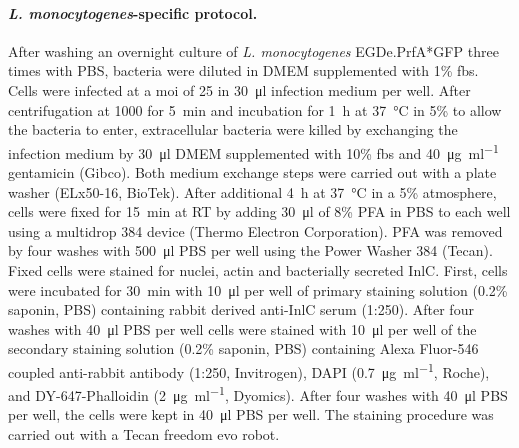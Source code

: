 \paragraph{\textit{L. monocytogenes}-specific protocol.}
After washing an overnight culture of \textit{L. monocytogenes} EGDe.PrfA*GFP three times with PBS, bacteria were diluted in DMEM supplemented with 1\% \gls{fbs}. Cells were infected at a \gls{moi} of 25 in \SI{30}{\micro\litre} infection medium per well. After centrifugation at \SI{1000}{\rpm} for \SI{5}{\minute} and incubation for \SI{1}{\hour} at \SI{37}{\celsius} in 5\%  to allow the bacteria to enter, extracellular bacteria were killed by exchanging the infection medium by \SI{30}{\micro\litre} DMEM supplemented with 10\% \gls{fbs} and \SI{40}{\micro\gram\per\milli\litre} gentamicin (Gibco). Both medium exchange steps were carried out with a plate washer (ELx50-16, BioTek). After additional \SI{4}{\hour} at \SI{37}{\celsius} in a 5\%  atmosphere, cells were fixed for \SI{15}{\minute} at RT by adding \SI{30}{\micro\litre} of 8\% PFA in PBS to each well using a multidrop 384 device (Thermo Electron Corporation). PFA was removed by four washes with \SI{500}{\micro\litre} PBS per well using the Power Washer 384 (Tecan). Fixed cells were stained for nuclei, actin and bacterially secreted InlC. First, cells were incubated for \SI{30}{\minute} with \SI{10}{\micro\litre} per well of primary staining solution (0.2\% saponin, PBS) containing rabbit derived anti-InlC serum (1:250). After four washes with \SI{40}{\micro\litre} PBS per well cells were stained with \SI{10}{\micro\litre} per well of the secondary staining solution (0.2\% saponin, PBS) containing Alexa Fluor-546 coupled anti-rabbit antibody (1:250, Invitrogen), DAPI (\SI{0.7}{\micro\gram\per\milli\litre}, Roche), and DY-647-Phalloidin (\SI{2}{\micro\gram\per\milli\litre}, Dyomics). After four washes with \SI{40}{\micro\litre} PBS per well, the cells were kept in \SI{40}{\micro\litre} PBS per well. The staining procedure was carried out with a Tecan freedom evo robot.


